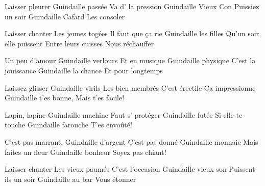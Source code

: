 \footnotemark [
ititle={Petites guindailles, les},
tu={Les petits papier (M : Régine / Gainsbourg, P : Guilde Horus)]


\beginverse
Laisser pleurer
Guindaille passée
Va d' la pression
Guindaille Vieux Con
Puissiez un soir
Guindaille Cafard
Les consoler
\endverse

\beginverse
Laisser chanter
Les jeunes togées
Il faut que ça rie
Guindaille les filles
Qu'un soir, elle puissent
Entre leurs cuisses
Nous réchauffer
\endverse

\beginverse
Un peu d'amour
Guindaille verlours
Et en musique
Guindaille physique
C'est la jouissance
Guindaille la chance
Et pour longtemps
\endverse

\beginverse
Laissez glisser
Guindaille virils
Les bien membrés
C'est érectile
Ca impressionne
Guindaille t'es bonne,
Mais t'es facile!
\endverse

\beginverse
Lapin, lapine
Guindaille machine
Faut s' protéger
Guindaille futée
Si elle te touche
Guindaille farouche
T'es envoûté!
\endverse

\beginverse
C'est pas marrant,
Guindaille d'argent
C'est pas donné
Guindaille monnaie
Mais faites un fleur
Guindaille bonheur
Soyez pas chiant!
\endverse

\beginverse
Laisser chanter
Les vieux paumés
C'est l'occasion
Guindaille vieux son
Puissent-ils un soir
Guindaille au bar
Vous étonner
\endverse

\beginverse
{}
\endverse
\endsong